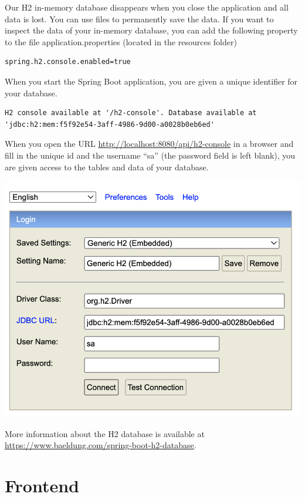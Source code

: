 \documentclass[a4paper, 12pt]{report}
\begin{document}
\begin{tcolorbox}[colback=blue!5!white,colframe=blue!75!black,title=H2 database]
Our H2 in-memory database disappears when you close the application and all data is lost.
You can use files to permanently save the data.  If you want to inspect the data of your in-memory database, you can add the following property to the file application.properties (located in the resources folder)
\begin{lstlisting}[frame=single]
spring.h2.console.enabled=true
\end{lstlisting}
When you start the Spring Boot application, you are given a unique identifier for your database.  
\begin{lstlisting}[frame=single]
H2 console available at '/h2-console'. Database available at 'jdbc:h2:mem:f5f92e54-3aff-4986-9d00-a0028b0eb6ed'
\end{lstlisting}
When you open the URL \url{http://localhost:8080/api/h2-console} in a browser and fill in the unique id and the username ``sa'' (the password field is left blank),  you are given access to the tables and data of your database. 

\includegraphics[width=\textwidth]{./images/chapter2/h2-database.png} 

More information about the H2 database is available at \url{https://www.baeldung.com/spring-boot-h2-database}.
\end{tcolorbox}

\section{Frontend}
\end{document}

